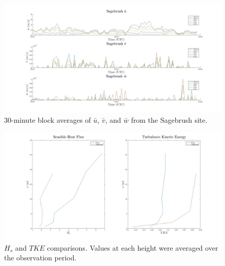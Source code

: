 \documentclass[]{article}
\begin{document}
\begin{figure}
	\centering
	\includegraphics[width=\textwidth]{sagerotate}
	\caption{30-minute block averages of $\bar{u}$, $\bar{v}$, and $\bar{w}$ from the Sagebrush site.}
	\label{fig:sagerotate}
\end{figure}

%

\begin{figure}
	\centering
	\includegraphics[width=\textwidth]{hstke}
	\caption{$H_s$ and $TKE$ comparisons. Values at each height were averaged over the observation period.}
	\label{fig:hstke}
\end{figure}
\end{document}
